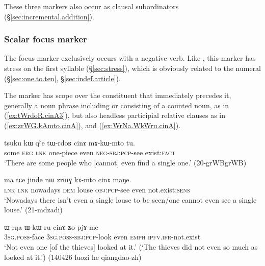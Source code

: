 These three markers also occur as clausal subordinators (§\ref{sec:incremental.addition}).
 
 
 \subsubsection{Scalar focus marker } \label{sec:cinA} 
 The focus marker  exclusively occurs with a negative verb. Like , this marker has stress on the first syllable  (§\ref{sec:stress}), which is obviously related to the numeral  (§\ref{sec:one.to.ten}, §\ref{sec:indef.article}).
 
 The marker  has scope over the constituent that immediately precedes it, generally a noun phrase including or consisting of a counted noun, as in (\ref{ex:tWrdoR.cinA3}), but also headless participial relative clauses as in (\ref{ex:zrWG.kAmto.cinA}), and (\ref{ex:WrNa.WkWru.cinA}).
 
 \begin{exe}
\ex \label{ex:tWrdoR.cinA3}
\gll tsuku kɯ qʰe tɯ-rdoʁ cinɤ mɤ-kɯ-mto tu. \\
some \textsc{erg} \textsc{lnk} one-piece even \textsc{neg}-\textsc{sbj}:\textsc{pcp}-see exist:\textsc{fact} \\
\glt `There are some people who [cannot] even find a single one.' (20-grWBgrWB)
 \end{exe} 
 
 \begin{exe}
\ex \label{ex:zrWG.kAmto.cinA}
\gll  ma tɕe jinde nɯ zrɯɣ kɤ-mto cinɤ maŋe. \\
\textsc{lnk} \textsc{lnk} nowadays \textsc{dem} louse \textsc{obj}:\textsc{pcp}-see even not.exist:\textsc{sens} \\
\glt `Nowadays there isn't even a single louse to be seen/one cannot even see a single louse.' (21-mdzadi)
\end{exe} 

\begin{exe}
\ex \label{ex:WrNa.WkWru.cinA}
\gll ɯ-rŋa ɯ-kɯ-ru cinɤ ʑo pjɤ-me \\
\textsc{3sg}.\textsc{poss}-face \textsc{3sg}.\textsc{poss}-\textsc{sbj}:\textsc{pcp}-look even \textsc{emph} \textsc{ipfv}.\textsc{ifr}-not.exist \\
\glt `Not even one [of the thieves] looked at it.' (`The thieves did not even so much as looked at it.') (140426 luozi he qiangdao-zh)
\end{exe}

